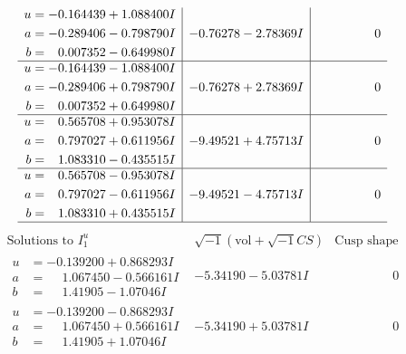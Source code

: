 \documentclass[1p]{elsarticle_modified}
\theoremstyle{definition}
\newcommand{\I}{\sqrt{-1}}
\begin{document}
$$\begin{array}{c|c|c}
\begin{aligned}
u &= -0.164439 + 1.088400 I \\
a &= -0.289406 - 0.798790 I \\
b &= \phantom{-}0.007352 - 0.649980 I\end{aligned}
 & -0.76278 - 2.78369 I & \phantom{-0.000000 } 0 \\ \hline\begin{aligned}
u &= -0.164439 - 1.088400 I \\
a &= -0.289406 + 0.798790 I \\
b &= \phantom{-}0.007352 + 0.649980 I\end{aligned}
 & -0.76278 + 2.78369 I & \phantom{-0.000000 } 0 \\ \hline\begin{aligned}
u &= \phantom{-}0.565708 + 0.953078 I \\
a &= \phantom{-}0.797027 + 0.611956 I \\
b &= \phantom{-}1.083310 - 0.435515 I\end{aligned}
 & -9.49521 + 4.75713 I & \phantom{-0.000000 } 0 \\ \hline\begin{aligned}
u &= \phantom{-}0.565708 - 0.953078 I \\
a &= \phantom{-}0.797027 - 0.611956 I \\
b &= \phantom{-}1.083310 + 0.435515 I\end{aligned}
 & -9.49521 - 4.75713 I & \phantom{-0.000000 } 0\\
 \hline 
 \end{array}$$\newpage$$\begin{array}{c|c|c}  
\text{Solutions to }I^u_{1}& \I (\text{vol} + \sqrt{-1}CS) & \text{Cusp shape}\\
 \hline 
\begin{aligned}
u &= -0.139200 + 0.868293 I \\
a &= \phantom{-}1.067450 - 0.566161 I \\
b &= \phantom{-}1.41905 - 1.07046 I\end{aligned}
 & -5.34190 - 5.03781 I & \phantom{-0.000000 } 0 \\ \hline\begin{aligned}
u &= -0.139200 - 0.868293 I \\
a &= \phantom{-}1.067450 + 0.566161 I \\
b &= \phantom{-}1.41905 + 1.07046 I\end{aligned}
 & -5.34190 + 5.03781 I & \phantom{-0.000000 } 0 \\ \hline\begin{aligned}

\end{aligned}
\end{array}$$
\end{document}
